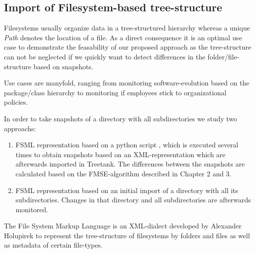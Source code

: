 

\subsection{Import of Filesystem-based tree-structure}
Filesystems usually organize data in a tree-structured hierarchy whereas a unique \emph{Path} denotes the location of a file. As a direct consequence it is an optimal use case to demonstrate the feasability of our proposed approach as the tree-structure can not be neglected if we quickly want to detect differences in the folder/file-structure based on snapshots.

Use cases are manyfold, ranging from monitoring software-evolution based on the package/class hierarchy to monitoring if employees stick to organizational policies.

In order to take snapshots of a directory with all subdirectories we study two approachs:

\begin{enumerate}
\item FSML representation based on a python script \cite{FSML}, which is executed several times to obtain snapshots based on an XML-representation which are afterwards imported in Treetank. The differences between the snapshots are calculated based on the FMSE-algorithm described in Chapter 2 and 3.
\item FSML representation based on an initial import of a directory with all its subdirectories. Changes in that directory and all subdirectories are afterwards monitored.
\end{enumerate}

The File System Markup Language\cite{FSML} is an XML-dialect developed by Alexander Holupirek to represent the tree-structure of filesystems by folders and files as well as metadata of certain file-types. 

